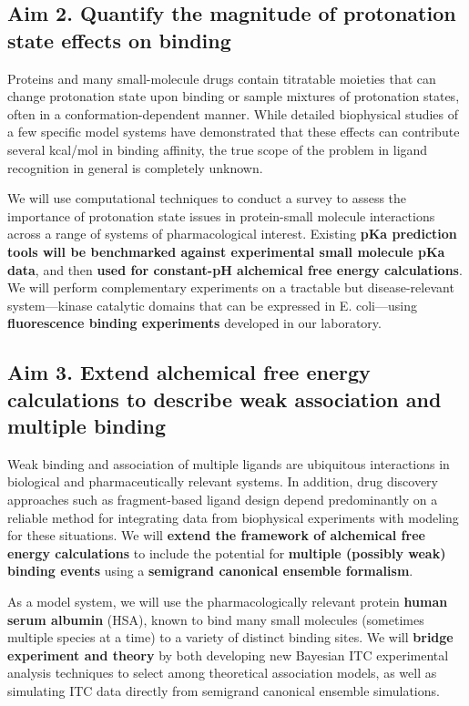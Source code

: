 \documentclass[10pt]{article}
\begin{document}
\subsection*{Aim 2. Quantify the magnitude of protonation state effects on binding}
Proteins and many small-molecule drugs contain titratable moieties that can change protonation state upon binding or sample mixtures of protonation states, often in a conformation-dependent manner.
While detailed biophysical studies of a few specific model systems have demonstrated that these effects can contribute several kcal/mol in binding affinity, the true scope of the problem in ligand recognition in general is completely unknown.

We will use computational techniques to conduct a survey to assess the importance of protonation state issues in protein-small molecule interactions across a range of systems of pharmacological interest.
Existing \textbf{ pKa prediction tools will be benchmarked against experimental small molecule pKa data}, and then \textbf{ used for constant-pH alchemical free energy calculations}.
We will perform complementary experiments on a tractable but disease-relevant system---kinase catalytic domains that can be expressed in E. coli---using \textbf{ fluorescence binding experiments } developed in our laboratory.

\subsection*{Aim 3. Extend alchemical free energy calculations to describe weak association and multiple binding}
Weak binding and association of multiple ligands are ubiquitous interactions in biological and pharmaceutically relevant systems.
In addition, drug discovery approaches such as fragment-based ligand design depend predominantly on a reliable method for integrating data from biophysical experiments with modeling for these situations.
We will \textbf{ extend the framework of alchemical free energy calculations}  to include the potential for \textbf{ multiple (possibly weak) binding events } using a \textbf{ semigrand canonical ensemble formalism}.

As a model system, we will use the pharmacologically relevant protein \textbf{ human serum albumin } (HSA), known to bind many small molecules (sometimes multiple species at a time) to a variety of distinct binding sites.
We will  \textbf{ bridge experiment and theory } by both developing new Bayesian ITC experimental analysis techniques to select among theoretical association models, as well as simulating ITC data directly from semigrand canonical ensemble simulations.
\end{document}
